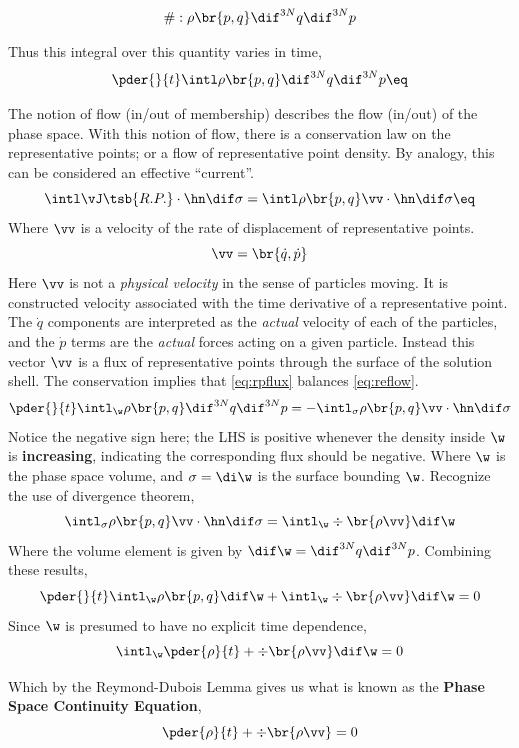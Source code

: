 \documentclass{article}
\begin{document}
\[ \# : \rho \br{p,q}\dif^{3N}q\dif^{3N}p \]

Thus this integral over this quantity varies in time,
\[ \pder{}{t}\intl \rho \br{p,q}\dif^{3N}q\dif^{3N}p \eq \label{eq:reflow} \]

The notion of flow (in/out of membership) describes the flow (in/out) of the phase space. With this notion of flow, there is a conservation law on the representative points; or a flow of representative point density. By analogy, this can be considered an effective ``current''.
\[ \intl \vJ\tsb{R.P.} \cdot \hn \dif \sigma = \intl \rho \br{p,q} \vv \cdot \hn \dif \sigma \eq \label{eq:rpflux} \]
Where $\vv$ is a velocity of the rate of displacement of representative points.
\[ \vv = \br{\dot{q}, \dot{p}} \]
Here $\vv$ is not a \textit{physical velocity} in the sense of particles moving. It is constructed velocity associated with the time derivative of a representative point. The $\dot{q}$ components are interpreted as the \textit{actual} velocity of each of the particles, and the $\dot{p}$ terms are the \textit{actual} forces acting on a given particle. Instead this vector $\vv$ is a flux of representative points through the surface of the solution shell. The conservation implies that \eqref{eq:rpflux} balances \eqref{eq:reflow}.
\[ \pder{}{t}\intl_\w \rho \br{p,q}\dif^{3N}q\dif^{3N}p = - \intl_\sigma \rho \br{p,q} \vv \cdot \hn \dif \sigma \]
Notice the negative sign here; the LHS is positive whenever the density inside $\w$ is \textbf{increasing}, indicating the corresponding flux should be negative. Where $\w$ is the phase space volume, and $\sigma = \di \w$ is the surface bounding $\w$. Recognize the use of divergence theorem,
\[ \intl_\sigma \rho \br{p,q} \vv \cdot \hn \dif \sigma = \intl_\w \div \br{\rho \vv} \dif \w \]
Where the volume element is given by $\dif \w = \dif^{3N}q\dif^{3N}p$. Combining these results,
\[ \pder{}{t}\intl_\w \rho \br{p,q}\dif \w + \intl_\w \div \br{\rho \vv} \dif \w = 0 \]
Since $\w$ is presumed to have no explicit time dependence,
\[ \intl_\w \pder{\rho}{t} + \div \br{\rho \vv} \dif \w = 0 \]

Which by the Reymond-Dubois Lemma gives us what is known as the \textbf{Phase Space Continuity Equation},
\[ \pder{\rho}{t}  + \div \br{\rho \vv} = 0 \]
\end{document}
